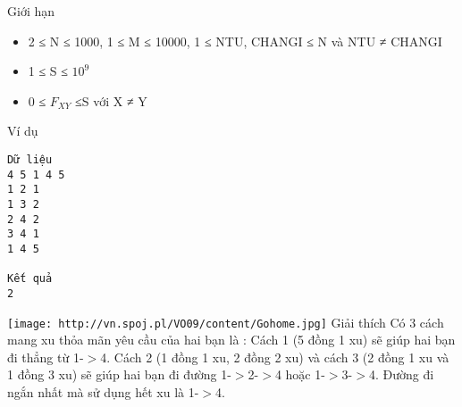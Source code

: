 Giới hạn  
\begin{itemize}
	\item     2 ≤ N ≤ 1000, 1 ≤ M ≤ 10000, 1 ≤ NTU, CHANGI ≤ N và NTU ≠ CHANGI   
	\item     1 ≤ S ≤ $10^{9}$
	\item     0 ≤ $F_{XY}$    ≤S với X ≠ Y   
\end{itemize}
   Ví dụ  
\begin{verbatim}
Dữ liệu
4 5 1 4 5
1 2 1
1 3 2
2 4 2
3 4 1
1 4 5	

Kết quả
2
\end{verbatim}
\texttt{[image: http://vn.spoj.pl/VO09/content/Gohome.jpg]}
   Giải thích  
Có 3 cách mang xu thỏa mãn yêu cầu của hai bạn là : Cách 1 (5 đồng 1 xu) sẽ giúp hai bạn đi thẳng từ 1-$>$4. Cách 2 (1 đồng 1 xu, 2 đồng 2 xu) và cách 3 (2 đồng 1 xu và 1 đồng 3 xu) sẽ giúp hai bạn đi đường 1-$>$2-$>$4 hoặc 1-$>$3-$>$4. Đường đi ngắn nhất mà sử dụng hết xu là 1-$>$4.